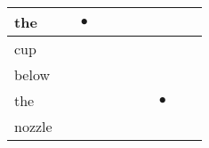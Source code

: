 \documentclass[landscape]{article}
\newcommand{\ssp}{\hspace{2pt}}
\newcommand{\mex}{\cellcolor{g}$\bullet$}
\begin{document}
\begin{tabular}{|l|p{10pt}|p{10pt}|p{10pt}|p{10pt}|p{10pt}|p{10pt}|p{10pt}|p{10pt}|p{10pt}|}
\hline
\ssp \cellcolor{ref1}the \ssp&\hspace{2pt}&\hspace{2pt}\mex&\hspace{2pt}&\hspace{2pt}&\hspace{2pt}&\hspace{2pt}&\hspace{2pt}&\hspace{2pt}&\hspace{2pt}\\
\hline
\ssp cup \ssp&\hspace{2pt}&\hspace{2pt}&\hspace{2pt}&\hspace{2pt}&\hspace{2pt}&\hspace{2pt}&\hspace{2pt}&\hspace{2pt}&\hspace{2pt}\\
\hline
\ssp below \ssp&\hspace{2pt}&\hspace{2pt}&\hspace{2pt}&\hspace{2pt}&\hspace{2pt}&\hspace{2pt}&\hspace{2pt}&\hspace{2pt}&\hspace{2pt}\\
\hline
\ssp \cellcolor{ref6}the \ssp&\hspace{2pt}&\hspace{2pt}&\hspace{2pt}&\hspace{2pt}&\hspace{2pt}&\hspace{2pt}&\hspace{2pt}\mex&\hspace{2pt}&\hspace{2pt}\\
\hline
\ssp nozzle \ssp&\hspace{2pt}&\hspace{2pt}&\hspace{2pt}&\hspace{2pt}&\hspace{2pt}&\hspace{2pt}&\hspace{2pt}&\hspace{2pt}&\hspace{2pt}\\

\end{tabular}
\end{document}
